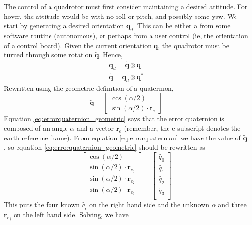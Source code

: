 \documentclass{article}
\numberwithin{equation}{section} %
\newcommand{\bs}[1]{\boldsymbol{#1}}
\begin{document}
The control of a quadrotor must first consider maintaining a desired attitude. For hover, the attitude would be with no roll or pitch, and possibly some yaw. We start by generating a desired orientation $\bs{q}_d$. This can be either a from some software routine (autonomous), or perhaps from a user control (ie, the orientation of a control board). Given the current orientation $\bs{q}$, the quadrotor must be turned through some rotation $\tilde{\bs{q}}$. Hence,
\begin{eqnarray}
\bs{q}_d = \tilde{\bs{q}} \otimes \bs{q} \\
\tilde{\bs{q}} = \bs{q}_d \otimes \bs{q}^* \label{eq:errorquaternion}
\end{eqnarray}
Rewritten using the geometric definition of a quaternion,
\begin{equation} \label{eq:errorquaternion_geometric}
\tilde{\bs{q}} = 
	\begin{bmatrix}
		\cos \left( \alpha / 2 \right) \\
		\sin \left( \alpha / 2 \right) \cdot \bs{r}_e
	\end{bmatrix}
\end{equation}
Equation \eqref{eq:errorquaternion_geometric} says that the error quaternion is composed of an angle $\alpha$ and a vector $\bs{r}_e$ (remember, the e subscript denotes the earth reference frame). From equation \eqref{eq:errorquaternion} we have the value of $\tilde{\bs{q}}$, so equation \eqref{eq:errorquaternion_geometric} should be rewritten as
\begin{equation}
\begin{bmatrix}
	\cos \left( \alpha / 2 \right) \\
	\sin \left( \alpha / 2 \right) \cdot \bs{r}_{e_1} \\
	\sin \left( \alpha / 2 \right) \cdot \bs{r}_{e_2} \\
	\sin \left( \alpha / 2 \right) \cdot \bs{r}_{e_3} \\
\end{bmatrix}
=
	\begin{bmatrix}
		\tilde{q_0} \\
		\tilde{q_1} \\
		\tilde{q_2} \\
		\tilde{q_3} \\
	\end{bmatrix}
\end{equation}
This puts the four known $\tilde{q_i}$ on the right hand side and the unknown $\alpha$ and three $\bs{r}_{e_j}$ on the left hand side. Solving, we have
\end{document}
